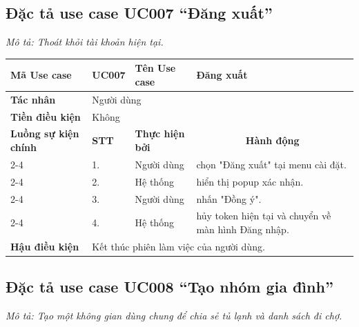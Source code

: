 \documentclass[../main.tex]{subfiles}
\begin{document}
\subsection{Đặc tả use case UC007 ``Đăng xuất''}
\textit{Mô tả: Thoát khỏi tài khoản hiện tại.}
\vspace{0.5cm}

\begingroup
\renewcommand{\arraystretch}{1.5}

\begin{longtable}{|p{2.7cm}|p{0.8cm}|p{2.6cm}|p{7.3cm}|}
\hline
\cellcolor[HTML]{D5F5E3}\textbf{Mã Use case} & \multicolumn{1}{l|}{UC007} & \cellcolor[HTML]{D5F5E3}\textbf{Tên Use case} & Đăng xuất \\ \hline
\cellcolor[HTML]{D5F5E3}\textbf{Tác nhân} & \multicolumn{3}{p{10.7cm}|}{Người dùng} \\ \hline
\cellcolor[HTML]{D5F5E3}\textbf{Tiền điều kiện} & \multicolumn{3}{p{10.7cm}|}{Không} \\ \hline

\cellcolor[HTML]{D5F5E3}\textbf{Luồng sự kiện chính} & \cellcolor[HTML]{FDEBD0}\textbf{STT} & \cellcolor[HTML]{FDEBD0}\textbf{Thực hiện bởi} & \multicolumn{1}{c|}{\cellcolor[HTML]{FDEBD0}\textbf{Hành động}} \\ \cline{2-4} 
\cellcolor[HTML]{D5F5E3} & 1. & Người dùng & chọn "Đăng xuất" tại menu cài đặt. \\ \cline{2-4} 
\cellcolor[HTML]{D5F5E3} & 2. & Hệ thống & hiển thị popup xác nhận. \\ \cline{2-4} 
\cellcolor[HTML]{D5F5E3} & 3. & Người dùng & nhấn "Đồng ý". \\ \cline{2-4} 
\cellcolor[HTML]{D5F5E3} & 4. & Hệ thống & hủy token hiện tại và chuyển về màn hình Đăng nhập. \\ \hline

\cellcolor[HTML]{D5F5E3}\textbf{Hậu điều kiện} & \multicolumn{3}{p{10.7cm}|}{Kết thúc phiên làm việc của người dùng.} \\ \hline
\end{longtable}
\endgroup

\subsection{Đặc tả use case UC008 ``Tạo nhóm gia đình''}
\textit{Mô tả: Tạo một không gian dùng chung để chia sẻ tủ lạnh và danh sách đi chợ.}
\vspace{0.5cm}
\end{document}
